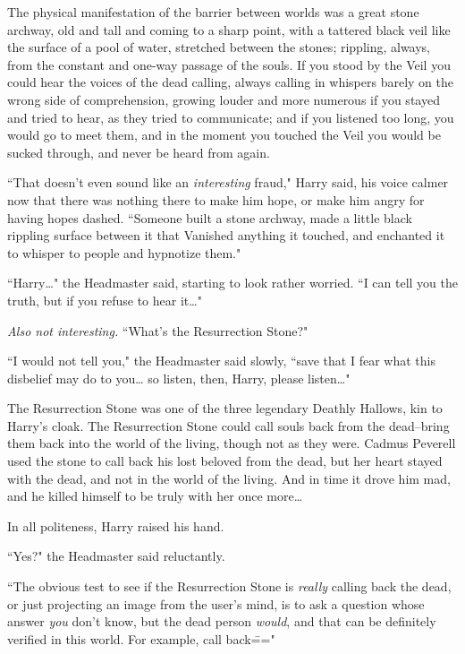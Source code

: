The physical manifestation of the barrier between worlds was a great stone archway, old and tall and coming to a sharp point, with a tattered black veil like the surface of a pool of water, stretched between the stones; rippling, always, from the constant and one-way passage of the souls. If you stood by the Veil you could hear the voices of the dead calling, always calling in whispers barely on the wrong side of comprehension, growing louder and more numerous if you stayed and tried to hear, as they tried to communicate; and if you listened too long, you would go to meet them, and in the moment you touched the Veil you would be sucked through, and never be heard from again.

``That doesn't even sound like an \emph{interesting} fraud," Harry said, his voice calmer now that there was nothing there to make him hope, or make him angry for having hopes dashed. ``Someone built a stone archway, made a little black rippling surface between it that Vanished anything it touched, and enchanted it to whisper to people and hypnotize them."

``Harry{\ldots}" the Headmaster said, starting to look rather worried. ``I can tell you the truth, but if you refuse to hear it{\ldots}"

\emph{Also not interesting.} ``What's the Resurrection Stone?"

``I would not tell you," the Headmaster said slowly, ``save that I fear what this disbelief may do to you{\ldots} so listen, then, Harry, please listen{\ldots}"

The Resurrection Stone was one of the three legendary Deathly Hallows, kin to Harry's cloak. The Resurrection Stone could call souls back from the dead\---bring them back into the world of the living, though not as they were. Cadmus Peverell used the stone to call back his lost beloved from the dead, but her heart stayed with the dead, and not in the world of the living. And in time it drove him mad, and he killed himself to be truly with her once more{\ldots}

In all politeness, Harry raised his hand.

``Yes?" the Headmaster said reluctantly.

``The obvious test to see if the Resurrection Stone is \emph{really} calling back the dead, or just projecting an image from the user's mind, is to ask a question whose answer \emph{you} don't know, but the dead person \emph{would}, and that can be definitely verified in this world. For example, call back\==="

